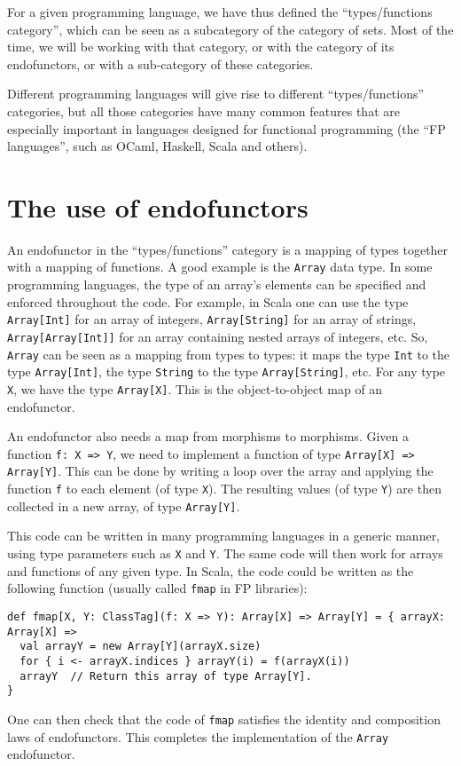For a given programming language, we have thus defined the \textsf{``}types/functions
category\textsf{''}, which can be seen as a subcategory of the category of
sets. Most of the time, we will be working with that category, or
with the category of its endofunctors, or with a sub-category of these
categories.

Different programming languages will give rise to different \textsf{``}types/functions\textsf{''}
categories, but all those categories have many common features that
are especially important in languages designed for functional programming
(the \textsf{``}FP languages\textsf{''}, such as OCaml, Haskell, Scala and others).

\section{The use of endofunctors}

An endofunctor in the \textsf{``}types/functions\textsf{''} category is a mapping
of types together with a mapping of functions. A good example is the
\lstinline!Array! data type. In some programming languages, the type
of an array\textsf{'}s elements can be specified and enforced throughout the
code. For example, in Scala one can use the type \lstinline!Array[Int]!
for an array of integers, \lstinline!Array[String]! for an array
of strings, \lstinline!Array[Array[Int]]! for an array containing
nested arrays of integers, etc. So, \lstinline!Array! can be seen
as a mapping from types to types: it maps the type \lstinline!Int!
to the type \lstinline!Array[Int]!, the type \lstinline!String!
to the type \lstinline!Array[String]!, etc. For any type \lstinline!X!,
we have the type \lstinline!Array[X]!. This is the object-to-object
map of an endofunctor.

An endofunctor also needs a map from morphisms to morphisms. Given
a function \lstinline!f: X => Y!, we need to implement a function
of type \lstinline!Array[X] => Array[Y]!. This can be done by writing
a loop over the array and applying the function \lstinline!f! to
each element (of type \lstinline!X!). The resulting values (of type
\lstinline!Y!) are then collected in a new array, of type \lstinline!Array[Y]!.

This code can be written in many programming languages in a generic
manner, using type parameters such as \lstinline!X! and \lstinline!Y!.
The same code will then work for arrays and functions of any given
type. In Scala, the code could be written as the following function
(usually called \lstinline!fmap! in FP libraries):
\begin{lstlisting}
def fmap[X, Y: ClassTag](f: X => Y): Array[X] => Array[Y] = { arrayX: Array[X] =>
  val arrayY = new Array[Y](arrayX.size)
  for { i <- arrayX.indices } arrayY(i) = f(arrayX(i))
  arrayY  // Return this array of type Array[Y].
}
\end{lstlisting}
One can then check that the code of \lstinline!fmap! satisfies the
identity and composition laws of endofunctors. This completes the
implementation of the \lstinline!Array! endofunctor.

